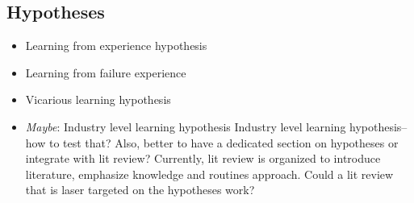 	\subsection{Hypotheses}
	\begin{paracol}{2}
	\begin{itemize}
		\item Learning from experience hypothesis
		\item Learning from failure experience
		\item Vicarious learning hypothesis
		\item \textit{Maybe}: Industry level learning hypothesis
		\switchcolumn Industry level learning hypothesis--how to test that? Also, better to have a dedicated section on hypotheses or integrate with lit review? Currently, lit review is organized to introduce literature, emphasize knowledge and routines approach. Could a lit review that is laser targeted on the hypotheses work?
		\switchcolumn*
	\end{itemize}
	\end{paracol}